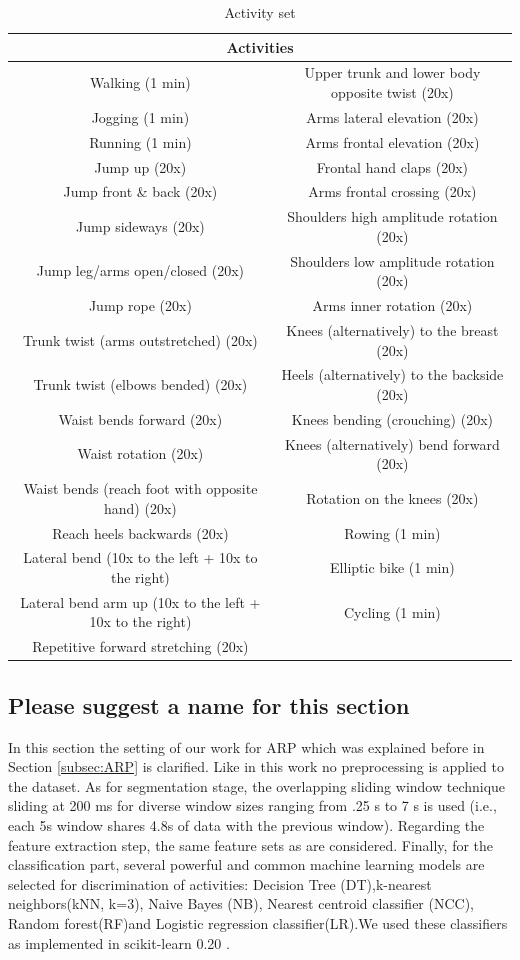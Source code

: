 \begin{table}[h!]
\tiny  
  \centering
\begin{tabular}{|c|c|}
\hline 
\multicolumn{2}{|c|}{Activities}\tabularnewline
\hline 
\hline 
Walking (1 min) & Upper trunk and lower body opposite twist (20x)\tabularnewline
\hline 
Jogging (1 min) & Arms lateral elevation (20x)\tabularnewline
\hline 
Running (1 min) & Arms frontal elevation (20x)\tabularnewline
\hline 
Jump up (20x) & Frontal hand claps (20x)\tabularnewline
\hline 
Jump front \& back (20x) & Arms frontal crossing (20x)\tabularnewline
\hline 
Jump sideways (20x) & Shoulders high amplitude rotation (20x)\tabularnewline
\hline 
Jump leg/arms open/closed (20x) & Shoulders low amplitude rotation (20x)\tabularnewline
\hline 
Jump rope (20x) & Arms inner rotation (20x)\tabularnewline
\hline 
Trunk twist (arms outstretched) (20x) & Knees (alternatively) to the breast (20x)\tabularnewline
\hline 
Trunk twist (elbows bended) (20x) & Heels (alternatively) to the backside (20x)\tabularnewline
\hline 
Waist bends forward (20x) & Knees bending (crouching) (20x)\tabularnewline
\hline 
Waist rotation (20x) & Knees (alternatively) bend forward (20x)\tabularnewline
\hline 
Waist bends (reach foot with opposite hand) (20x) & Rotation on the knees (20x)\tabularnewline
\hline 
Reach heels backwards (20x) & Rowing (1 min)\tabularnewline
\hline 
Lateral bend (10x to the left + 10x to the right) & Elliptic bike (1 min)\tabularnewline
\hline 
Lateral bend arm up (10x to the left + 10x to the right) & Cycling (1 min)\tabularnewline
\hline 
Repetitive forward stretching (20x) & \tabularnewline
\hline 
\end{tabular}

        \caption{Activity set }
        \label{tab:Activites}

\end{table} 


\subsection{Please suggest a name for this section}
In this section the setting of our work for ARP which was explained before in Section \ref{subsec:ARP} is clarified. Like \cite{banos2014window} in this work no preprocessing is applied to the dataset. As for segmentation stage, the overlapping sliding window technique sliding at 200 ms for diverse window sizes ranging from .25 s to 7 s is used (i.e., each 5s window shares 4.8s of data with the previous window). Regarding the feature extraction step, the same feature sets as \cite{banos2014window} are considered. Finally, for the classification part, several powerful and common machine learning models are selected for discrimination of activities: Decision Tree (DT),k-nearest neighbors(kNN, k=3), Naive Bayes (NB), Nearest centroid classifier (NCC), Random forest(RF)and Logistic regression classifier(LR).We used these classifiers as implemented in scikit-learn 0.20 \cite{pedregosa2011scikit}.\newline

